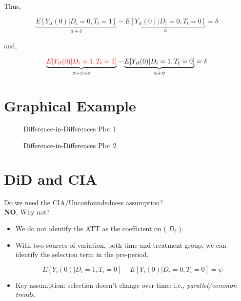 \documentclass[
  letterpaper,
  DIV=11,
  numbers=noendperiod]{scrreprt}
\theoremstyle{definition}
\theoremstyle{remark}
\begin{document}
\begin{enumerate}
  Thus,

  \[
  \underbrace{E[Y_{it}(0)|D_i=0,T_t=1]}_{\alpha + \delta} - \underbrace{E[Y_{it}(0)|D_i=0,T_t=0]}_{\alpha} = \delta
  \]

  and,

  \[
  \underbrace{\textcolor{red}{E[Y_{it}(0)|D_i=1,T_t=1]}}_{\alpha + \psi + \delta} - \underbrace{E[Y_{it}(0)|D_i=1,T_t=0]}_{\alpha + \psi} = \delta
  \]

  \section{Graphical Example}\label{graphical-example}

  \begin{figure}


  \caption{\label{fig-graph1}Difference-in-Differences Plot 1}

  \end{figure}%

  \begin{figure}


  \caption{\label{fig-graph2}Difference-in-Differences Plot 2}

  \end{figure}%

  \section{DiD and CIA}\label{did-and-cia}

  Do we need the CIA/Unconfoundedness assumption?\\
  \textbf{NO}, Why not?

  \begin{itemize}
  \item
    We do not identify the ATT as the coefficient on ( \(D_i\) ).
  \item
    With two sources of variation, both time and treatment group, we can
    identify the selection term in the pre-period,

    \[
    E[Y_i(0)|D_i=1,T_i=0] - E[Y_i(0)|D_i=0,T_i=0] = \psi
    \]
  \item
    Key assumption: selection doesn't change over time; i.e.,
    \emph{parallel/common trends}.
  \end{itemize}


\end{enumerate}
\end{document}
